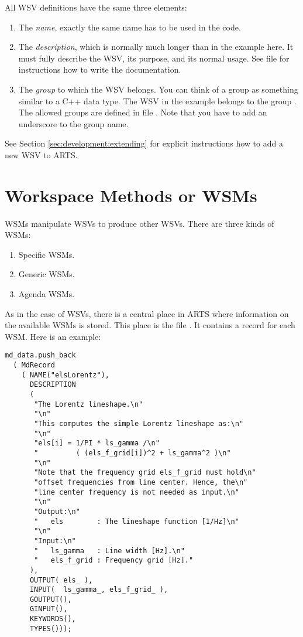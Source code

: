 \noindent
All WSV definitions have the same three elements:
\begin{enumerate}
\item The \emph{name}, exactly the
  same name has to be used in the code.
\item The \emph{description}, which is normally much longer than in
  the example here. It must fully describe the WSV, its purpose, and
  its normal usage. See file  for instructions
  how to write the documentation.
\item The \emph{group} to which the WSV belongs. You can think of a
  group as something similar to a C++ data type. The WSV in the
  example belongs to the group . The allowed groups
  are defined in file . Note that you have to add
  an underscore to the group name.
\end{enumerate}

\noindent
See Section \ref{sec:development:extending} for explicit
instructions how to add a new WSV to ARTS.

\section{Workspace Methods or WSMs}
\label{sec:agendas:wsms}

WSMs manipulate WSVs to produce other WSVs. There are three kinds of
WSMs:
\begin{enumerate}
\item Specific WSMs.
\item Generic WSMs.
\item Agenda WSMs.
\end{enumerate}
As in the case of WSVs, there is a central place in ARTS where
information on the available WSMs is stored. This place is the file
. It contains a record for each WSM. Here is an
example:

{\small
\begin{verbatim}
md_data.push_back
  ( MdRecord
    ( NAME("elsLorentz"),
      DESCRIPTION
      (
       "The Lorentz lineshape.\n"
       "\n"
       "This computes the simple Lorentz lineshape as:\n"
       "\n"
       "els[i] = 1/PI * ls_gamma /\n"
       "         ( (els_f_grid[i])^2 + ls_gamma^2 )\n"
       "\n"
       "Note that the frequency grid els_f_grid must hold\n"
       "offset frequencies from line center. Hence, the\n"
       "line center frequency is not needed as input.\n"
       "\n"
       "Output:\n"
       "   els        : The lineshape function [1/Hz]\n"
       "\n"
       "Input:\n"
       "   ls_gamma   : Line width [Hz].\n"
       "   els_f_grid : Frequency grid [Hz]."
      ),
      OUTPUT( els_ ),
      INPUT(  ls_gamma_, els_f_grid_ ),
      GOUTPUT(),
      GINPUT(),
      KEYWORDS(),
      TYPES()));
\end{verbatim}
}

